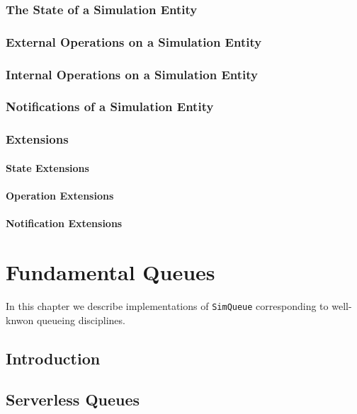 \documentclass[12pt]{book}
\begin{document}
\subsection{The State of a Simulation Entity}

\subsection{External Operations on a Simulation Entity}

\subsection{Internal Operations on a Simulation Entity}

\subsection{Notifications of a Simulation Entity}

\subsection{Extensions}

\subsubsection{State Extensions}

\subsubsection{Operation Extensions}

\subsubsection{Notification Extensions}

\chapter{Fundamental Queues}

In this chapter we describe implementations of \lstinline|SimQueue| corresponding
  to well-knwon queueing disciplines.

\section{Introduction}

\section{Serverless Queues}
\end{document}
